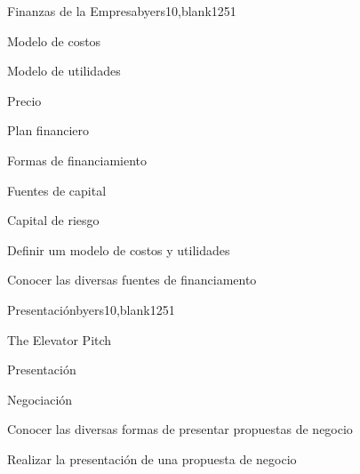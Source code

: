\begin{syllabus}
\begin{unit}{Finanzas de la Empresa}{byers10,blank12}{5}{1}
	\begin{topics}
      \item Modelo de costos
      \item Modelo de utilidades
      \item Precio
      \item Plan financiero
      \item Formas de financiamiento
      \item Fuentes de capital
      \item Capital de riesgo
   \end{topics}

   \begin{learningoutcomes}
      \item Definir um modelo de costos y utilidades
      \item Conocer las diversas fuentes de financiamento
   \end{learningoutcomes}
\end{unit}

\begin{unit}{Presentación}{byers10,blank12}{5}{1}
	\begin{topics}
      \item The Elevator Pitch
      \item Presentación
      \item Negociación
    \end{topics}

   \begin{learningoutcomes}
      \item Conocer las diversas formas de presentar propuestas de negocio
      \item Realizar la presentación de una propuesta de negocio
   \end{learningoutcomes}
\end{unit}



\begin{coursebibliography}
\end{coursebibliography}

\end{syllabus}
